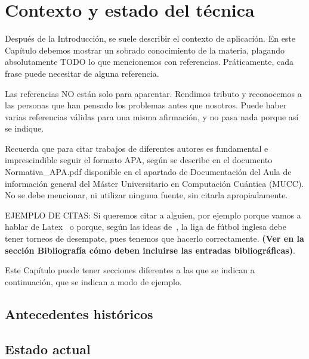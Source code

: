 \chapter{Contexto y estado del técnica}

Después de la Introducción, se suele describir el contexto de aplicación. En este Capítulo debemos mostrar un sobrado conocimiento de la materia, plagando absolutamente TODO lo que mencionemos con referencias. Práticamente, cada frase puede necesitar de alguna referencia.

Las referencias NO están solo para aparentar. Rendimos tributo y reconocemos a las personas que han pensado los problemas antes que nosotros. Puede haber varias referencias válidas para una misma afirmación, y no pasa nada porque así se indique.

Recuerda que para citar trabajos de diferentes autores es fundamental e imprescindible seguir el formato APA, según se describe en el documento Normativa\_APA.pdf disponible en el apartado de Documentación del Aula de información general del Máster Universitario en Computación Cuántica (MUCC). No se debe mencionar, ni utilizar ninguna fuente, sin citarla apropiadamente.

EJEMPLO DE CITAS: Si queremos citar a alguien, por ejemplo porque vamos a hablar de Latex~\citep{lamport1994} o porque, según las ideas de~\cite{ackerman2017}, la liga de fútbol inglesa debe tener torneos de desempate, pues tenemos que hacerlo correctamente. \textbf{(Ver en la sección Bibliografía cómo deben incluirse las entradas bibliográficas)}.

Este Capítulo puede tener secciones diferentes a las que se indican a continuación, que se indican a modo de ejemplo.

\section{Antecedentes históricos}

\section{Estado actual}